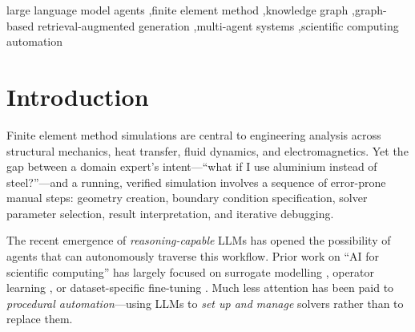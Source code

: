 \documentclass[preprint,review,12pt]{elsarticle}
\newif\ifrevisionsvisible
\newcommand{\revised}[1]{%
  \ifrevisionsvisible\textcolor{revisionred}{#1}\else#1\fi}
\begin{document}
\begin{frontmatter}
\begin{abstract}
KG~Smart's reliability advantage; (v) an adaptive KG decision framework
(Algorithm~1) that selects the optimal retrieval mode per task; (vi)
production-scale agent quality metrics from 1{,}369 real simulation runs
showing 97.8\% overall success and \revised{an 85.4\%} first-try rate; and
(vii) a controlled 100-task KG growth experiment showing that accumulated
run history yields a difficulty-dependent quality gain, with hard-task MPF
improving by 8.8\% between passes while easy and novel tasks remain at
ceiling.  All code, models, and evaluation artifacts are released openly.
Taken together, these results point to \emph{integration pattern}, rather
than knowledge content, as what decides whether GraphRAG augmentation helps
or hinders an LLM agent, and they yield concrete design principles for
autonomous FEM simulation assistants.
\end{abstract}

\begin{keyword}
large language model agents \sep finite element method \sep knowledge graph
\sep graph-based retrieval-augmented generation \sep multi-agent systems
\sep scientific computing automation
\end{keyword}

\end{frontmatter}

\linenumbers

\section{Introduction}
\label{sec:intro}

Finite element method simulations are central to engineering analysis across
structural mechanics, heat transfer, fluid dynamics, and electromagnetics.
Yet the gap between a domain expert's intent—``what if I use aluminium instead
of steel?''—and a running, verified simulation involves a sequence of error-prone
manual steps: geometry creation, boundary condition specification, solver
parameter selection, result interpretation, and iterative debugging.

The recent emergence of \emph{reasoning-capable} LLMs \citep{brown2020gpt3,
wei2022cot, yao2023react} has opened the possibility of agents that can
autonomously traverse this workflow.  Prior work on ``AI for scientific
computing'' has largely focused on surrogate modelling
\citep{lagaris1998neural, raissi2019pinn, karniadakis2021physics}, operator
learning \citep{li2021fno}, or dataset-specific fine-tuning
\citep{jumper2021alphafold}.  Much less attention has been paid to
\emph{procedural automation}—using LLMs to \emph{set up and manage} solvers
rather than to replace them.
\end{document}

